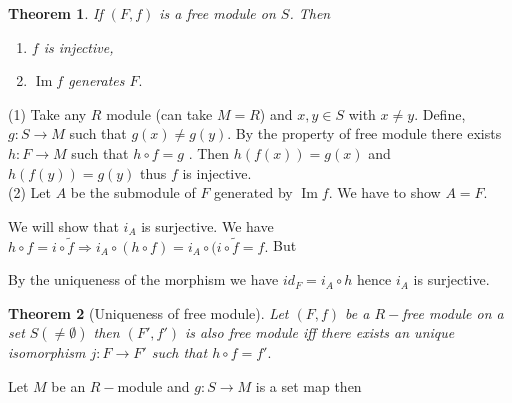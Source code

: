 \documentclass[11pt]{amsart}
\newtheorem{theorem}{Theorem}[section]
\DeclareMathOperator{\im}{\text{Im}}
\begin{document}
\begin{theorem}
If $(F,f)$ is a free module on $S$. Then \begin{enumerate}
\item $f$ is injective,
\item $\im f$ generates $F.$
\end{enumerate}
\end{theorem}
\proof (1) Take any $R$ module (can take $M=R$) and $x,y\in S$ with $x\neq y.$ Define, $g:S\to M$ such that $g(x)\neq g(y)$. By the property of free module there exists $h:F\to M$ such that $h\circ f=g$ . Then $h(f(x))=g(x)$ and $h(f(y))=g(y)$ thus $f$ is injective.\\
(2) Let $A$ be the submodule of $F$ generated by $\im f$. We have to show $A=F.$ \begin{center}
\end{center}
We will show that $i_A$ is surjective. We have $h\circ f=i\circ \tilde{f} \Rightarrow i_A\circ (h\circ f)=i_A\circ (i\circ \tilde{f}=f.$ But \begin{center}
\end{center}
By the uniqueness of the morphism we have $id_F=i_A\circ h$ hence $i_A$ is surjective.
\begin{theorem}[Uniqueness of free module]
Let $(F,f)$ be a $R-$free module on a set $S(\neq \emptyset)$ then $(F',f')$ is also free module iff there exists an unique isomorphism $j:F\to F'$ such that $h\circ f=f'.$
\end{theorem}
\proof Let $M$ be an $R-$module and $g:S\to M$ is a set map then \begin{center}
\end{center}
\end{document}
